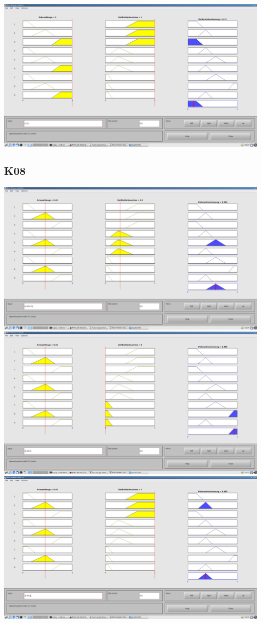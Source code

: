 \includegraphics[width=\textwidth]{part/screenshots/fuzzy-17c-K04-1-1}

\subsection*{K08}
\includegraphics[width=\textwidth]{part/screenshots/fuzzy-17c-K08-0,45-0,3}
\includegraphics[width=\textwidth]{part/screenshots/fuzzy-17c-K08-0,45-0}
\includegraphics[width=\textwidth]{part/screenshots/fuzzy-17c-K08-0,45-1}
